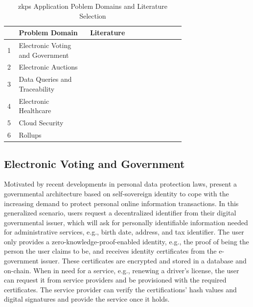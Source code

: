\setlength{\tabcolsep}{2ex}
\renewcommand{\arraystretch}{1.5}%
\begin{table}[ht]
	\centering
	    \caption{\acrshort{zkp}s Application Poblem Domains and Literature Selection}
		\begin{tabular}{| m{0.02\linewidth} | m{0.3\linewidth} | m{0.4\linewidth}|}
		\hline
		\textbf{} & \textbf{Problem Domain} & \textbf{Literature} \\ \hline
            1 & Electronic Voting and \newline Government & \citet{Bansod, Guo, Querejeta} \\  \hline
            2 & Electronic Auctions & \citet{LiXue, WangZhaoMu} \\ \hline 
            3 & Data Queries and \newline Traceability & \citet{Godden, XueWang}  \\  \hline
            4 & Electronic Healthcare & \citet{LuongPark, ZHENG, WangEtAl, Huangetal} \\  \hline 
            5 & Cloud Security & \citet{LiuWangPengXing, Major, Munivel, Kanagamani} \\  \hline 
            6 & Rollups & \citet{chen2022review, scalingintro, zksyncintro, buterinrollups} \\  \hline 
	\end{tabular}
\label{tab:domains}
\end{table}

\subsection{Electronic Voting and Government}
Motivated by recent developments in personal data protection laws, \citet{Bansod} present a governmental architecture based on self-sovereign identity to cope with the increasing demand to protect personal online information transactions. In this generalized scenario, users request a decentralized identifier from their digital governmental issuer, which will ask for personally identifiable information needed for administrative services, e.g., birth date, address, and tax identifier. The user only provides a zero-knowledge-proof-enabled identity, e.g., the proof of being the person the user claims to be, and receives identity certificates from the e-government issuer. These certificates are encrypted and stored in a database and on-chain. When in need for a service, e.g., renewing a driver's license, the user can request it from service providers and be provisioned with the required certificates. The service provider can verify the certifications' hash values and digital signatures and provide the service once it holds.


